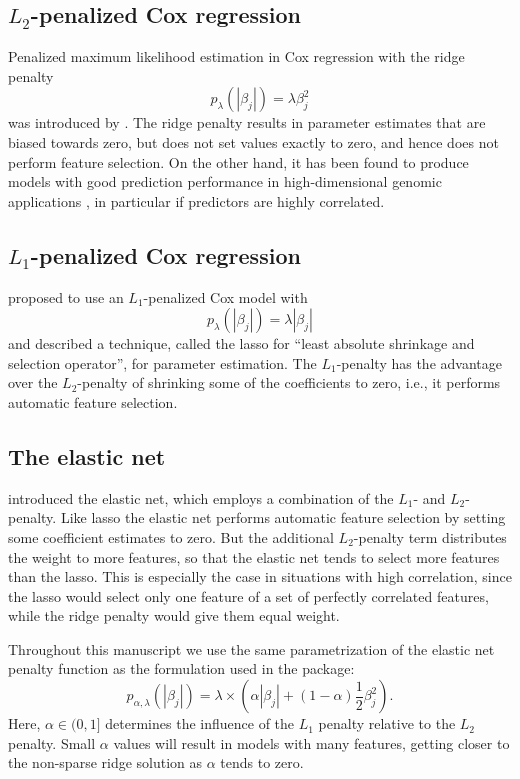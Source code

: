 \documentclass[]{jss}
\begin{document}
\subsection{$L_2$-penalized Cox regression}
Penalized maximum likelihood estimation in Cox regression with the ridge penalty
\begin{equation}\label{ridge}
p_{\lambda}(|\beta_j|)=\lambda\beta_j^2
\end{equation}
was introduced by \citet{verweij94}.
The ridge penalty results in parameter estimates that are biased towards zero, but does not set values exactly to zero, and hence does not perform feature selection.
On the other hand, it has been found to produce models with good prediction performance in high-dimensional genomic applications \citep[e.g.,][]{bovelstad07}, in particular if predictors are highly correlated.

\subsection{$L_1$-penalized Cox regression}
 proposed to use an $L_1$-penalized Cox model with
\begin{equation}
p_{\lambda}(|\beta_j|)=\lambda | \beta_j |
\end{equation}
and described a technique, called the lasso for ``least absolute shrinkage and selection operator'', for parameter estimation.
The $L_1$-penalty has the advantage over the $L_2$-penalty of shrinking some of the coefficients to zero, i.e., it performs automatic feature selection.

\subsection{The elastic net}
 introduced the elastic net, which employs a combination of the $L_1$- and $L_2$-penalty. Like lasso the elastic net performs automatic feature selection by setting some coefficient estimates to zero.
But the additional $L_2$-penalty term distributes the weight to more features, so that the elastic net tends to select more features than the lasso. 
This is especially the case in situations with high correlation, since the lasso would select only one feature of a set of perfectly correlated features, while the ridge penalty would give them equal weight.

Throughout this manuscript we use the same parametrization of the elastic net penalty function as the formulation used in the  package:
  \begin{equation}\label{enet2}
p_{\alpha,\lambda}(|\beta_j|)= \lambda\times (\alpha |\beta_j| + (1-\alpha)\frac{1}{2} \beta_j^2).
\end{equation}
Here, $\alpha \in (0,1]$ determines the influence of the $L_1$ penalty relative to the $L_2$ penalty. Small $\alpha$ values will result in models with many features, getting closer to the non-sparse ridge solution as $\alpha$ tends to zero.
\end{document}
